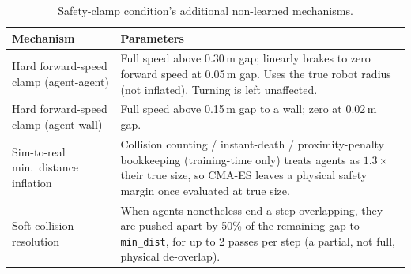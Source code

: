 \documentclass[11pt]{article}
\begin{document}
\begin{table}[h]
\centering
\caption{Safety-clamp condition's additional non-learned mechanisms.}
\label{tab:clamp}
\begin{tabular}{@{}lp{10cm}@{}}
\toprule
Mechanism & Parameters \\
\midrule
Hard forward-speed clamp (agent-agent) & Full speed above 0.30\,m gap; linearly brakes to zero forward speed at 0.05\,m gap. Uses the true robot radius (not inflated). Turning is left unaffected. \\
Hard forward-speed clamp (agent-wall) & Full speed above 0.15\,m gap to a wall; zero at 0.02\,m gap. \\
Sim-to-real min.\ distance inflation & Collision counting / instant-death / proximity-penalty bookkeeping (training-time only) treats agents as $1.3\times$ their true size, so CMA-ES leaves a physical safety margin once evaluated at true size. \\
Soft collision resolution & When agents nonetheless end a step overlapping, they are pushed apart by 50\% of the remaining gap-to-\texttt{min\_dist}, for up to 2 passes per step (a partial, not full, physical de-overlap). \\
\bottomrule
\end{tabular}
\end{table}
\end{document}
